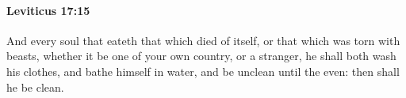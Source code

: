 
		\paragraph{Leviticus 17:15} %
			\label{LEVITICUS-17-15}

			And every soul that eateth that which died of itself, or that which was torn with beasts, whether it be one of your own country, or a stranger, he shall both wash his clothes, and bathe himself in water, and be unclean until the even: then shall he be clean.


